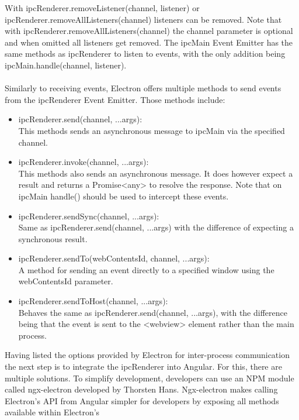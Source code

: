With ipcRenderer.removeListener(channel, listener) or\\
 ipcRenderer.removeAllListeners(channel) listeners can be removed.
Note that with ipcRenderer.removeAllListeners(channel) the channel parameter is optional and when omitted
all listeners get removed.
The ipcMain Event Emitter has the same methods as ipcRenderer to 
listen to events, with the only addition being ipcMain.handle(channel, listener).\paragraph{}
Similarly to receiving events, Electron offers multiple methods to send events from the ipcRenderer Event Emitter. 
Those methods include: \parencite{electronDocs}
\begin{itemize}
    \item ipcRenderer.send(channel, ...args):\\
     This methods sends an asynchronous message to ipcMain via the specified channel. 
    \item ipcRenderer.invoke(channel, ...args):\\
    This methods also sends an asynchronous message. 
    It does however expect a result and returns a Promise<any> to resolve the response.
    Note that on ipcMain handle() should be used to intercept these events.
    \item ipcRenderer.sendSync(channel, ...args):\\
     Same as ipcRenderer.send(channel, ...args) with the difference of 
    expecting a synchronous result.
    \item ipcRenderer.sendTo(webContentsId, channel, ...args):\\
    A method for sending an event directly to a specified window 
    using the webContentsId parameter.
    \item ipcRenderer.sendToHost(channel, ...args):\\
     Behaves the same as ipcRenderer.send(channel, ...args), with the 
    difference being that the event is sent to the <webview> element rather than the main process.
\end{itemize}
Having listed the options provided by Electron for inter-process communication the next step is to integrate the ipcRenderer into Angular.
For this, there are multiple solutions. 
To simplify development, developers can use an NPM module called ngx-electron developed by Thorsten Hans. \parencite{ngxElectron}
Ngx-electron makes calling Electron's API from Angular simpler for developers by exposing all methods available within Electron's
